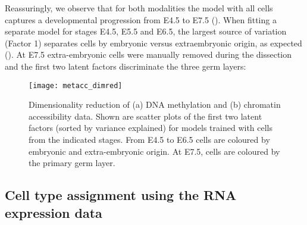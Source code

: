 
Reassuringly, we observe that for both modalities the model with all cells captures a developmental progression from E4.5 to E7.5 (). When fitting a separate model for stages E4.5, E5.5 and E6.5, the largest source of variation (Factor 1) separates cells by embryonic versus extraembryonic origin, as expected (). At E7.5 extra-embryonic cells were manually removed during the dissection and the first two latent factors discriminate the three germ layers:

\begin{figure}[H]
	\centering
	\texttt{[image: metacc\_dimred]}
	\caption[]{
 	Dimensionality reduction of (a) DNA methylation and (b) chromatin accessibility data. Shown are scatter plots of the first two latent factors (sorted by variance explained) for models trained with cells from the indicated stages. From E4.5 to E6.5 cells are coloured by embryonic and extra-embryonic origin. At E7.5, cells are coloured by the primary germ layer. 
	}
	\label{fig:metacc_dimred}
\end{figure}


\subsection{Cell type assignment using the RNA expression data}

